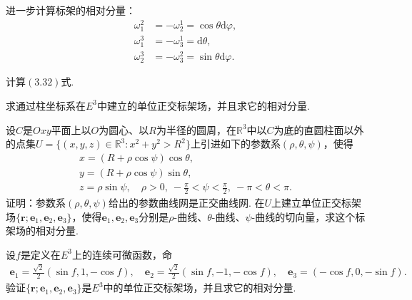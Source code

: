 \documentclass[../../main.tex]{subfiles}%
\begin{document}
\begin{solution}
进一步计算标架的相对分量：
\begin{align}
\omega_1^2 &= -\omega_2^1 = \cos\theta\mathrm{d}\varphi, \nonumber \\
\omega_1^3 &= -\omega_3^1 = \mathrm{d}\theta, \nonumber \\
\omega_2^3 &= -\omega_3^2 = \sin\theta\mathrm{d}\varphi. \label{eq:rel-comp-sphere}
\end{align}

\end{solution}

\begin{example}
计算$(3.32)$式.
\end{example}

\begin{example}
求通过柱坐标系在$E^3$中建立的单位正交标架场，并且求它的相对分量.
\end{example}

\begin{example}
设$C$是$Oxy$平面上以$O$为圆心、以$R$为半径的圆周，在$\mathbb{R}^3$中以$C$为底的直圆柱面以外的点集$U=\{(x,y,z)\in\mathbb{R}^3:x^2+y^2>R^2\}$上引进如下的参数系$(\rho,\theta,\psi)$，使得
\begin{gather*}
x = (R+\rho\cos\psi)\cos\theta, \\
y = (R+\rho\cos\psi)\sin\theta, \\
z = \rho\sin\psi,\quad \rho>0,\ -\frac{\pi}{2}<\psi<\frac{\pi}{2},\ -\pi<\theta<\pi.
\end{gather*}
证明：参数系$(\rho,\theta,\psi)$给出的参数曲线网是正交曲线网. 在$U$上建立单位正交标架场$\{\bm{r};\bm{e}_1,\bm{e}_2,\bm{e}_3\}$，使得$\bm{e}_1,\bm{e}_2,\bm{e}_3$分别是$\rho$-曲线、$\theta$-曲线、$\psi$-曲线的切向量，求这个标架场的相对分量.
\end{example}

\begin{example}
设$f$是定义在$E^3$上的连续可微函数，命
\begin{align*}
\bm{e}_1 = \frac{\sqrt{2}}{2}(\sin f,1,-\cos f), \quad
\bm{e}_2 = \frac{\sqrt{2}}{2}(\sin f,-1,-\cos f), \quad
\bm{e}_3 = (-\cos f,0,-\sin f).
\end{align*}
验证$\{\bm{r};\bm{e}_1,\bm{e}_2,\bm{e}_3\}$是$E^3$中的单位正交标架场，并且求它的相对分量.
\end{example}
\end{document}
